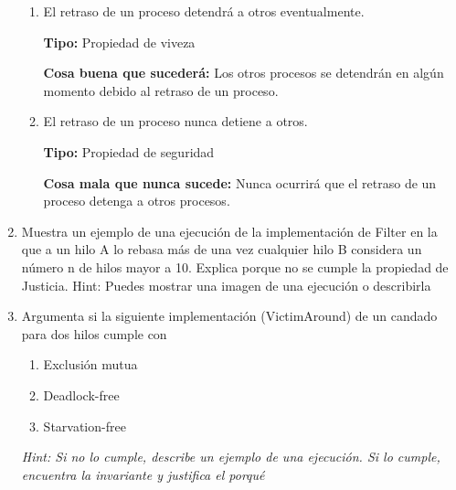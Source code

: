 \begin{enumerate}
\begin{enumerate}
        \item El retraso de un proceso detendrá a otros eventualmente.

         \textbf{Tipo:} Propiedad de viveza
         
         \textbf{Cosa buena que sucederá:} Los otros procesos se detendrán en algún momento debido al retraso de un proceso.

         \hfill

        \item El retraso de un proceso nunca detiene a otros.

        \textbf{Tipo:} Propiedad de seguridad
        
        \textbf{Cosa mala que nunca sucede:} Nunca ocurrirá que el retraso de un proceso detenga a otros procesos.

        \hfill

    \end{enumerate}

    \hfill

    \item Muestra un ejemplo de una ejecución de la implementación de Filter en la que a un hilo A lo rebasa más de una vez cualquier hilo B considera un número n de hilos mayor a 10. Explica porque no se cumple la propiedad de Justicia. Hint: Puedes mostrar una imagen de una ejecución o describirla

    \hfill

    \item Argumenta si la siguiente implementación (VictimAround) de un candado para dos hilos cumple con

    \begin{enumerate}
        \item Exclusión mutua

        \item Deadlock-free

        \item Starvation-free
    \end{enumerate}
    
    
    \textit{Hint: Si no lo cumple, describe un ejemplo de una ejecución. Si lo cumple, encuentra la invariante y justifica el porqué}


\end{enumerate}
